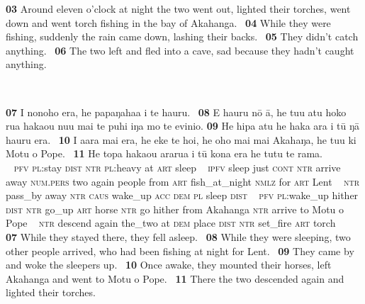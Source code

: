 \medskip\glt
\textbf{\textup{03}} Around eleven o’clock at night the two went out, lighted their torches, went down and went torch fishing in the bay of Akahanga. ~\textbf{\textup{04}} While they were fishing, suddenly the rain came down, lashing their backs. ~\textbf{\textup{05}} They didn’t catch anything. ~\textbf{\textup{06}} The two left and fled into a cave, sad because they hadn’t caught anything.


~

\bigskip\gll
\textbf{\textup{07}} I nonoho era, he papaŋaha{\ꞌ}a {\ꞌ}i te ha{\ꞌ}uru. ~\textbf{\textup{08}} E ha{\ꞌ}uru nō {\ꞌ}ā, he tu{\ꞌ}u atu hoko rua haka{\ꞌ}ou nu{\ꞌ}u mai te puhi iŋa mo te evinio. \textbf{\textup{09}} He hipa atu he haka {\ꞌ}ara i tū ŋā ha{\ꞌ}uru era. ~\textbf{\textup{10}} I {\ꞌ}a{\ꞌ}ara mai era, he eke te hoi, he oho mai mai {\ꞌ}Akahaŋa, he tu{\ꞌ}u ki Motu o Pope. ~\textbf{\textup{11}} He topa haka{\ꞌ}ou ararua {\ꞌ}i tū kona era he tutu te rama.\\
~ \textsc{pfv} \textsc{pl}:stay \textsc{dist} \textsc{ntr} \textsc{pl}:heavy at \textsc{art} sleep ~ \textsc{ipfv} sleep just \textsc{cont} \textsc{ntr} arrive away \textsc{num.pers} two again people from \textsc{art} fish\_at\_night \textsc{nmlz} for \textsc{art} Lent  ~ \textsc{ntr} pass\_by away \textsc{ntr} \textsc{caus} wake\_up \textsc{acc} \textsc{dem} \textsc{pl} sleep \textsc{dist} ~ \textsc{pfv} \textsc{pl}:wake\_up hither \textsc{dist} \textsc{ntr} go\_up \textsc{art} horse \textsc{ntr} go hither from Akahanga \textsc{ntr} arrive to Motu o Pope ~ \textsc{ntr} descend again the\_two at \textsc{dem} place \textsc{dist} \textsc{ntr} set\_fire \textsc{art} torch\\

\medskip\glt
\textbf{\textup{07}} While they stayed there, they fell asleep. ~\textbf{\textup{08}} While they were sleeping, two other people arrived, who had been fishing at night for Lent. ~\textbf{\textup{09}} They came by and woke the sleepers up. ~\textbf{\textup{10}} Once awake, they mounted their horses, left Akahanga and went to Motu o Pope. ~\textbf{\textup{11}} There the two descended again and lighted their torches.


~

